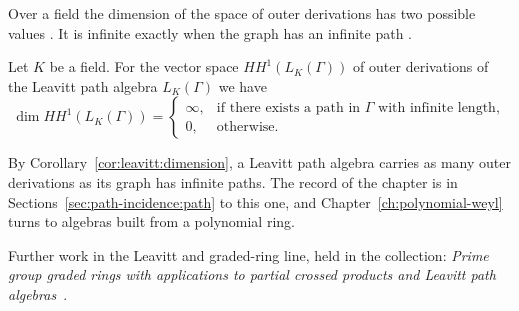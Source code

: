 Over a field the dimension of the space of outer derivations has two possible values
\cite[p.~79]{Lopatkin2019}. It is infinite exactly when the graph has an infinite
path \cite[p.~79]{Lopatkin2019}.

\begin{corollary}\label{cor:leavitt:dimension}
Let $K$ be a field. For the vector space $HH^{1}(L_{K}(\Gamma))$ of outer
derivations of the Leavitt path algebra $L_{K}(\Gamma)$ we have
\begin{equation*}
\dim HH^{1}(L_{K}(\Gamma))=
\begin{cases}
\infty, & \text{if there exists a path in }\Gamma\text{ with infinite length},\\
0, & \text{otherwise}.
\end{cases}
\end{equation*}
\end{corollary}

By Corollary~\ref{cor:leavitt:dimension}, a Leavitt path algebra carries as many
outer derivations as its graph has infinite paths. The record of the chapter is in
Sections~\ref{sec:path-incidence:path} to this one, and
Chapter~\ref{ch:polynomial-weyl} turns to algebras built from a polynomial ring.

Further work in the Leavitt and graded-ring line, held in the collection:
\noindent\emph{Prime group graded rings with applications to partial crossed products and Leavitt path algebras}~\cite{LibPrimeGroupGradedRings2021}.
